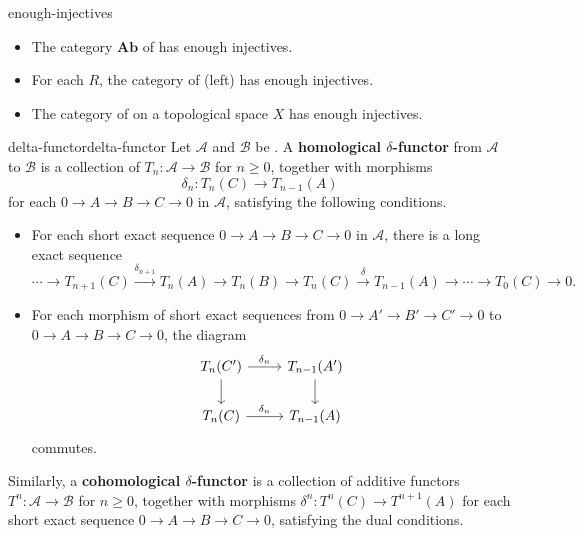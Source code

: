 \begin{example}{enough-injectives}
    \begin{itemize}
        \item The category $\textbf{Ab}$ of  has enough injectives.
        \item For each  $R$, the category of (left)  has enough injectives.
        \item The category of  on a topological space $X$ has enough injectives.
    \end{itemize}
\end{example}

\begin{topic}{delta-functor}{delta-functor}
    Let $\mathcal{A}$ and $\mathcal{B}$ be . A \textbf{homological $\delta$-functor} from $\mathcal{A}$ to $\mathcal{B}$ is a collection of  $T_n \colon \mathcal{A} \to \mathcal{B}$ for $n \ge 0$, together with morphisms
    \[ \delta_n \colon T_n(C) \to T_{n - 1}(A) \]
    for each  $0 \to A \to B \to C \to 0$ in $\mathcal{A}$, satisfying the following conditions.
    \begin{itemize}
        \item For each short exact sequence $0 \to A \to B \to C \to 0$ in $\mathcal{A}$, there is a long exact sequence
        \[ \cdots \to T_{n + 1}(C) \xrightarrow{\delta_{n + 1}} T_n(A) \to T_n(B) \to T_n(C) \xrightarrow{\delta} T_{n - 1}(A) \to \cdots \to T_0(C) \to 0 . \]
        \item For each morphism of short exact sequences from $0 \to A' \to B' \to C' \to 0$ to $0 \to A \to B \to C \to 0$, the diagram
        \[ \svg \begin{tikzcd} T_n(C') \arrow{r}{\delta_n} \arrow{d} & T_{n - 1}(A') \arrow{d} \\ T_n(C) \arrow{r}{\delta_n} & T_{n - 1}(A) \end{tikzcd} \]
        commutes.
    \end{itemize}
    Similarly, a \textbf{cohomological $\delta$-functor} is a collection of additive functors $T^n \colon \mathcal{A} \to \mathcal{B}$ for $n \ge 0$, together with morphisms $\delta^n \colon T^n(C) \to T^{n + 1}(A)$ for each short exact sequence $0 \to A \to B \to C \to 0$, satisfying the dual conditions.
\end{topic}

